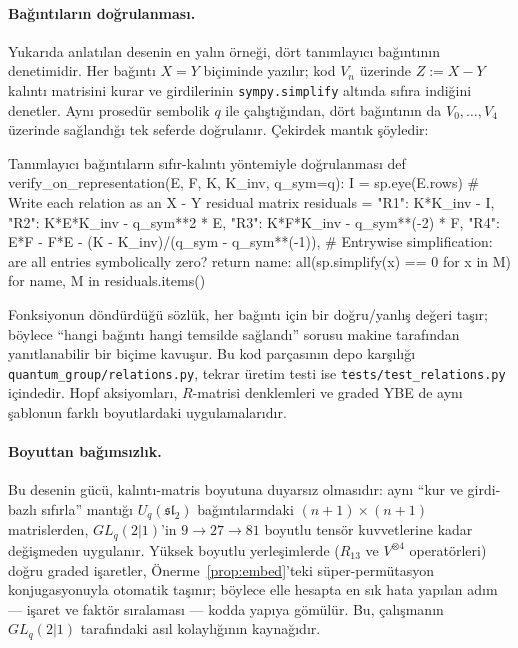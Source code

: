 \documentclass[10pt]{math}
\numberwithin{equation}{section}
\theoremstyle{plain}
\theoremstyle{definition}
\renewcommand{\sl}{\mathfrak{sl}}
\newcommand{\Uq}{U_q(\sl_2)}
\begin{document}
\paragraph{Bağıntıların doğrulanması.} Yukarıda anlatılan desenin en yalın
örneği, dört tanımlayıcı bağıntının denetimidir. Her bağıntı $X = Y$ biçiminde
yazılır; kod $V_n$ üzerinde $Z := X - Y$ kalıntı matrisini kurar ve girdilerinin
\texttt{sympy.simplify} altında sıfıra indiğini denetler. Aynı prosedür sembolik
$q$ ile çalıştığından, dört bağıntının da $V_0,\dots,V_4$ üzerinde sağlandığı
tek seferde doğrulanır. Çekirdek mantık şöyledir:

\begin{pythoncode}{Tanımlayıcı bağıntıların sıfır-kalıntı yöntemiyle doğrulanması}
def verify_on_representation(E, F, K, K_inv, q_sym=q):
    I = sp.eye(E.rows)
    # Write each relation as an X - Y residual matrix
    residuals = {
        "R1": K*K_inv - I,
        "R2": K*E*K_inv - q_sym**2 * E,
        "R3": K*F*K_inv - q_sym**(-2) * F,
        "R4": E*F - F*E - (K - K_inv)/(q_sym - q_sym**(-1)),
    }
    # Entrywise simplification: are all entries symbolically zero?
    return {
        name: all(sp.simplify(x) == 0 for x in M)
        for name, M in residuals.items()
    }
\end{pythoncode}

Fonksiyonun döndürdüğü sözlük, her bağıntı için bir doğru/yanlış değeri taşır;
böylece ``hangi bağıntı hangi temsilde sağlandı'' sorusu makine tarafından
yanıtlanabilir bir biçime kavuşur. Bu kod parçasının depo karşılığı
\texttt{quantum\_group/relations.py}, tekrar üretim testi ise
\texttt{tests/test\_relations.py} içindedir. Hopf aksiyomları, $R$-matrisi
denklemleri ve graded YBE de aynı şablonun farklı boyutlardaki uygulamalarıdır.

\paragraph{Boyuttan bağımsızlık.} Bu desenin gücü, kalıntı-matris boyutuna
duyarsız olmasıdır: aynı ``kur ve girdi-bazlı sıfırla'' mantığı $\Uq$
bağıntılarındaki $(n{+}1)\times(n{+}1)$ matrislerden, $GL_q(2|1)$'in
$9\to 27\to 81$ boyutlu tensör kuvvetlerine kadar değişmeden uygulanır. Yüksek
boyutlu yerleşimlerde ($R_{13}$ ve $V^{\otimes 4}$ operatörleri) doğru graded
işaretler, Önerme~\ref{prop:embed}'teki süper-permütasyon konjugasyonuyla
otomatik taşınır; böylece elle hesapta en sık hata yapılan adım --- işaret ve
faktör sıralaması --- kodda yapıya gömülür. Bu, çalışmanın $GL_q(2|1)$
tarafındaki asıl kolaylığının kaynağıdır.
\end{document}
